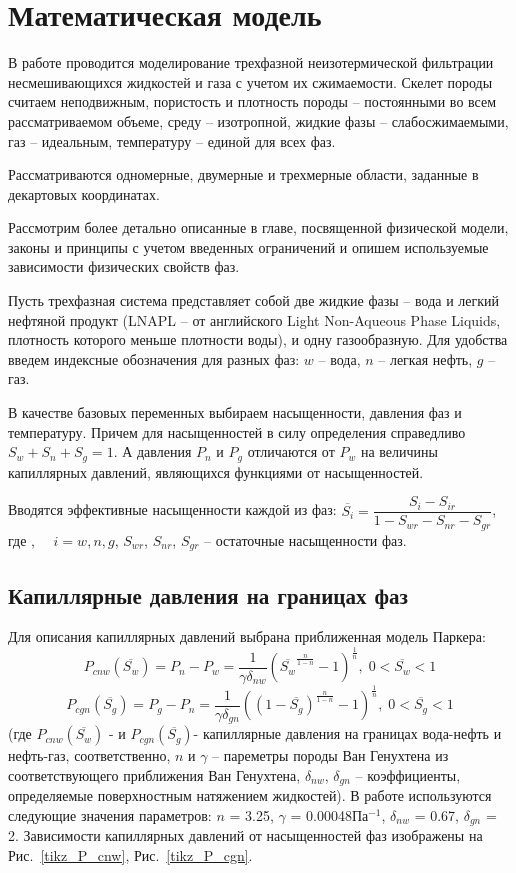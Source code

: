 %
\section{Математическая модель}
\label{math_section}
%
В работе проводится моделирование трехфазной неизотермической фильтрации 
несмешивающихся жидкостей и газа с учетом их сжимаемости. Скелет породы
считаем неподвижным, пористость и плотность породы -- постоянными во всем
рассматриваемом объеме, среду -- изотропной, жидкие фазы -- слабосжимаемыми,
газ -- идеальным, температуру -- единой для всех фаз.

Рассматриваются одномерные, двумерные и трехмерные
области, заданные в декартовых координатах.

Рассмотрим более детально описанные в главе, посвященной физической
модели, законы и принципы с учетом введенных ограничений и опишем
используемые зависимости физических свойств фаз.

Пусть трехфазная система представляет собой две жидкие фазы -- вода и легкий
нефтяной продукт (LNAPL -- от английского Light Non-Aqueous Phase Liquids,
плотность которого меньше плотности воды), и одну газообразную.
Для удобства введем индексные обозначения для разных фаз: $w$ -- вода, $n$ --
легкая нефть, $g$ -- газ.

В качестве базовых переменных выбираем насыщенности, давления фаз и температуру.
Причем для насыщенностей в силу определения справедливо  $S_w + S_n + S_g = 1$.
А давления $P_n$ и $P_g$ отличаются от $P_w$ на величины капиллярных
давлений, являющихся функциями от насыщенностей.

Вводятся эффективные насыщенности каждой из фаз:
$\overline{S_i}={\dfrac{S_i-S_{ir}}{1-S_{wr}-S_{nr}-S_{gr}}}$, где , ${\quad}i=w,n,g$, $S_{wr}$,
$S_{nr}$, $S_{gr}$ -- остаточные насыщенности фаз.

\subsection{Капиллярные давления на границах фаз}
Для описания
капиллярных давлений выбрана приближенная модель Паркера\cite{Parker}:
$$P_{cnw}(\overline{S_w})=P_n-P_w={\frac{1}{\gamma \delta_{nw}}}
\left( \overline{S_w}^{\frac{n}{1-n}}-1 \right)^\frac{1}{n},\;0<\overline{S_w}<1 $$
$$P_{cgn}(\overline{S_g})=P_g-P_n={\frac{1}{\gamma \delta_{gn}}}
\left( (1-\overline{S_g})^{\frac{n}{1-n}}-1 \right)^\frac{1}{n},\;0<\overline{S_g}<1$$
(где $P_{cnw}(\overline{S_w})$ - и $P_{cgn}(\overline{S_g})$- капиллярные давления на границах вода-нефть и нефть-газ, 
соответственно, $n$ и $\gamma $ -- пареметры породы Ван Генухтена из соответствующего приближения
Ван Генухтена\cite{Genuchten}, $\delta_{nw}$, $\delta_{gn}$ -- коэффициенты, определяемые поверхностным натяжением 
жидкостей). В работе используются следующие значения параметров: $n$ = 3.25, $\gamma $ = 0.00048Па$^{-1}$,
$\delta_{nw}$ = 0.67, $\delta_{gn}$ = 2. Зависимости капиллярных давлений от насыщенностей фаз
изображены на Рис.~\ref{tikz_P_cnw}, Рис.~\ref{tikz_P_cgn}.

